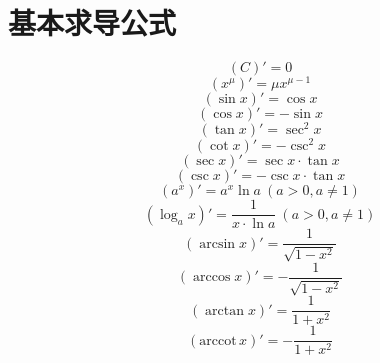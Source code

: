 \documentclass[10pt,a4paper]{article}
\begin{document}
\section{基本求导公式}
\begin{multicols}{2}
    \begin{equation}
        \left( C\right)'=0
    \end{equation}
    \begin{equation}
        \left( x^{\mu}\right)'=\mu x^{\mu-1}
    \end{equation}
    \begin{equation}
        \left( \sin x\right)'=\cos x
    \end{equation}
    \begin{equation}
        \left( \cos x\right)'=-\sin x
    \end{equation}
    \begin{equation}
        \left( \tan x\right)'=\sec^2 x
    \end{equation}
    \begin{equation}
        \left( \cot x\right)'=-\csc^2 x
    \end{equation}
    \begin{equation}
        \left( \sec x\right)'=\sec x\cdot\tan x
    \end{equation}
    \begin{equation}
        \left( \csc x\right)'=-\csc x\cdot\tan x
    \end{equation}
    \begin{equation}
        \left( a^x\right)'=a^x\ln a\ (a>0,a\neq1)
    \end{equation}
    \begin{equation}
        \left( \log_{a}x\right)'=\frac{1}{x\cdot\ln a}\ (a>0,a\neq1)
    \end{equation}
    \begin{equation}
        \left( \arcsin x\right)'=\frac{1}{\sqrt{1-x^2}}
    \end{equation}
    \begin{equation}
        \left( \arccos x\right)'=-\frac{1}{\sqrt{1-x^2}}
    \end{equation}
    \begin{equation}
        \left( \arctan x\right)'=\frac{1}{1+x^2}
    \end{equation}
    \begin{equation}
        \left( \mathrm{arccot}\, x\right)'=-\frac{1}{1+x^2}
    \end{equation}
\end{multicols}
\end{document}
